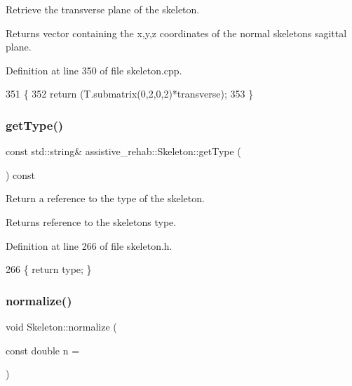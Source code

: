 Retrieve the transverse plane of the skeleton. 

\begin{DoxyReturn}{Returns}
vector containing the x,y,z coordinates of the normal skeleton\textquotesingle{}s sagittal plane. 
\end{DoxyReturn}


Definition at line 350 of file skeleton.\+cpp.


\begin{DoxyCode}
351 \{
352     \textcolor{keywordflow}{return} (T.submatrix(0,2,0,2)*transverse);
353 \}
\end{DoxyCode}
\mbox{\label{classassistive__rehab_1_1Skeleton_a4efc4844bd2b185f1080ee52ab69cb04}} 
\subsubsection{\texorpdfstring{get\+Type()}{getType()}}
{\footnotesize\ttfamily const std\+::string\& assistive\+\_\+rehab\+::\+Skeleton\+::get\+Type (\begin{DoxyParamCaption}{ }\end{DoxyParamCaption}) const\hspace{0.3cm}{\ttfamily [inline]}}



Return a reference to the type of the skeleton. 

\begin{DoxyReturn}{Returns}
reference to the skeleton\textquotesingle{}s type. 
\end{DoxyReturn}


Definition at line 266 of file skeleton.\+h.


\begin{DoxyCode}
266 \{ \textcolor{keywordflow}{return} type; \}
\end{DoxyCode}
\mbox{\label{classassistive__rehab_1_1Skeleton_a7753cc8d2b43e27eaf7bf9ef640a99cb}} 
\subsubsection{\texorpdfstring{normalize()}{normalize()}}
{\footnotesize\ttfamily void Skeleton\+::normalize (\begin{DoxyParamCaption}\item[{const double}]{n = {} }\end{DoxyParamCaption})}



